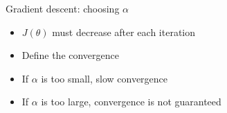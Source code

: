 \documentclass[
  9pt,
  ignorenonframetext,
  aspectratio=169,
  t, dvipsnames]{beamer}
\providecommand{\tightlist}{%
  \setlength{\itemsep}{0pt}\setlength{\parskip}{0pt}}\usepackage{longtable,booktabs,array}
\theoremstyle{definition}
\begin{document}
\begin{frame}{Gradient descent: choosing \(\alpha\)}
\protect\hypertarget{gradient-descent-choosing-alpha}{}
\begin{itemize}
\tightlist
\item
  \(J(\theta)\) must decrease after each iteration
\item
  Define the convergence
\end{itemize}

\begin{figure}

\begin{minipage}[t]{0.50\linewidth}

{\centering 


}

\end{minipage}%
%
\begin{minipage}[t]{0.50\linewidth}

{\centering 


}

\end{minipage}%

\end{figure}

\begin{itemize}
\tightlist
\item
  If \(\alpha\) is too small, slow convergence
\item
  If \(\alpha\) is too large, convergence is not guaranteed
\end{itemize}
\end{frame}
\end{document}
